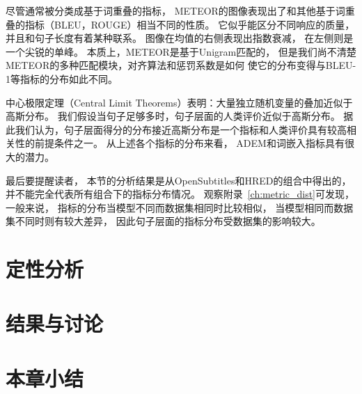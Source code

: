 尽管通常被分类成基于词重叠的指标，
METEOR的图像表现出了和其他基于词重叠的指标（BLEU，ROUGE）相当不同的性质。
它似乎能区分不同响应的质量，并且和句子长度有着某种联系。
图像在均值的右侧表现出指数衰减， 在左侧则是一个尖锐的单峰。
本质上，METEOR是基于Unigram匹配的，
但是我们尚不清楚METEOR的多种匹配模块，对齐算法和惩罚系数是如何
使它的分布变得与BLEU-1等指标的分布如此不同。

中心极限定理（Central Limit Theorems）表明：大量独立随机变量的叠加近似于高斯分布。
我们假设当句子足够多时，句子层面的人类评价近似于高斯分布。
据此我们认为，句子层面得分的分布接近高斯分布是一个指标和人类评价具有较高相关性的前提条件之一。
从上述各个指标的分布来看， ADEM和词嵌入指标具有很大的潜力。

最后要提醒读者，
本节的分析结果是从OpenSubtitles和HRED的组合中得出的，
并不能完全代表所有组合下的指标分布情况。
观察附录~\ref{ch:metric_dist}可发现， 一般来说，
指标的分布当模型不同而数据集相同时比较相似，
当模型相同而数据集不同时则有较大差异，
因此句子层面的指标分布受数据集的影响较大。

\section{定性分析}\label{sec:qualitative_analysis}


\section{结果与讨论}\label{sec:result_and_discussion}

\section{本章小结}\label{sec:experiment_conclusion}
